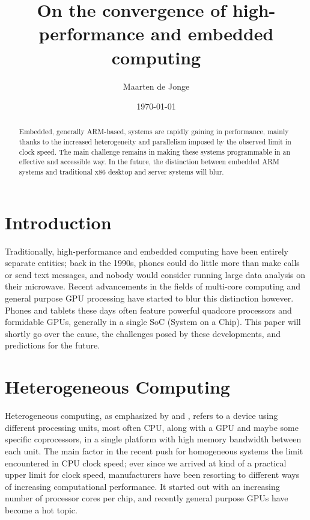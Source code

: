 \documentclass[a4paper]{article}
\author{Maarten de Jonge}
\date{\today}
\title{On the convergence of high-performance and embedded computing}
\begin{document}
\maketitle

\begin{abstract}
    Embedded, generally ARM-based, systems are rapidly gaining in performance,
    mainly thanks to the increased heterogeneity and parallelism imposed by the
    observed limit in clock speed. The main challenge remains in making these
    systems programmable in an effective and accessible way. In the future, the
    distinction between embedded ARM systems and traditional x86 desktop and
    server systems will blur.
\end{abstract}

\section{Introduction}
Traditionally, high-performance and embedded computing have been entirely
separate entities; back in the 1990s, phones could do little more than make
calls or send text messages, and nobody would consider running large data
analysis on their microwave. Recent advancements in the fields of multi-core
computing and general purpose GPU processing have started to blur this
distinction however. Phones and tablets these days often feature powerful
quadcore processors and formidable GPUs, generally in a single SoC (System on a
Chip). This paper will shortly go over the cause, the challenges posed by these
developments, and predictions for the future.

\section{Heterogeneous Computing}
Heterogeneous computing, as emphasized by \cite{conf/iccd/KaeliA11} and
\cite{crowley2006impact}, refers to a device using different processing units,
most often CPU, along with a GPU and maybe some specific coprocessors, in a
single platform with high memory bandwidth between each unit. The main factor in
the recent push for homogeneous systems the limit encountered in CPU clock
speed\cite{conf/iccd/KaeliA11}; ever since we arrived at kind of a practical
upper limit for clock speed, manufacturers have been resorting to different ways
of increasing computational performance. It started out with an increasing
number of processor cores per chip, and recently general purpose GPUs have
become a hot topic.  
\end{document}
